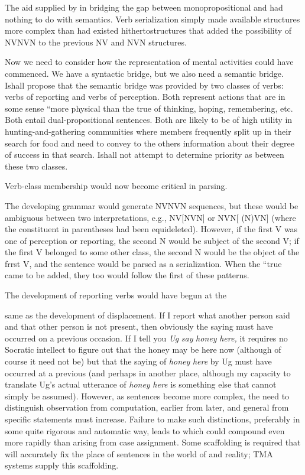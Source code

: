 The aid supplied by  in bridging the gap between monopropositional and  had nothing to do with semantics. Verb serialization simply made available structures more complex than had existed hithertostructures that added the possibility of NVNVN to the previous NV and NVN structures.

Now we need to consider how the representation of mental activities could have commenced. We have a syntactic bridge, but we also need a semantic bridge. Ishall propose that the semantic bridge was provided by two classes of verbs: verbs of reporting and verbs of perception. Both represent actions that are in some sense ``more phy\-sical than the true  of thinking, hoping, remem\-bering, etc. Both entail dual-propositional sentences. Both are likely to be of high utility in hunting-and-gathering communities where members frequently split up in their search for food and need to con\-vey to the others information about their degree of success in that search. Ishall not attempt to determine priority as between these two classes.

Verb-class membership would now become critical in parsing.


The developing grammar would generate NVNVN sequences, but these would be ambiguous between two interpretations, e.g., NV[NVN] or NVN[ (N)VN] (where the constituent in parentheses had been equi\-deleted). However, if the first V was one of perception or reporting, the second N would be subject of the second V; if the first V belonged to some other class, the second N would be the object of the frrst V, and the sentence would be parsed as a serialization. When the ``true  came to be added, they too would follow the first of these patterns.

The development of reporting verbs would have begun at the

same  as the development of displacement. If I report what another person said and that other person is not present, then obviously the saying must have occurred on a previous occasion. If I tell you \textit{U}\textit{g} \textit{say} \textit{honey} \textit{here,} it requires no Socratic intellect to figure out that the honey may be here now (although of course it need not be) but that the saying of \textit{honey} \textit{here} by Ug must have occurred at a previous  (and perhaps in another place, although my capacity to translate Ug's actual utterance of \textit{honey} \textit{here} is something else that cannot simply be assumed). However, as sentences become more complex, the need to distinguish observation from computation, earlier from later, and general from specific statements must increase. Failure to make such distinctions, preferably in some quite rigorous and automatic way, leads to  which could compound even more rapidly than  arising from case assignment. Some scaffolding is required that will accurately fix the place of sentences in the world of  and reality; TMA systems supply this scaffolding.

